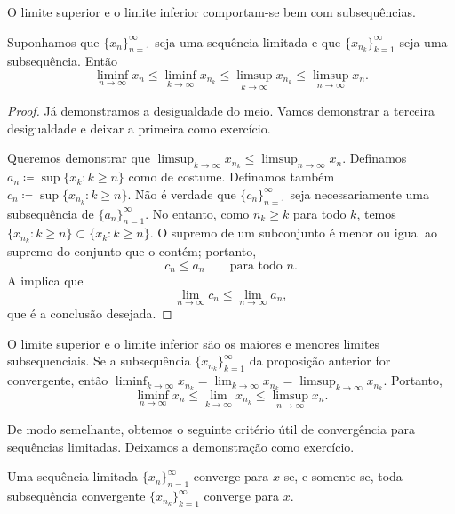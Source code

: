 O limite superior e o limite inferior comportam-se bem
com subsequências.

\begin{prop} \label{prop:subseqslimsupinf}
Suponhamos que $\{ x_n \}_{n=1}^\infty$ seja uma sequência limitada e
que $\{ x_{n_k} \}_{k=1}^\infty$ seja uma subsequência. Então
\begin{equation*}
\liminf_{n\to\infty} x_n \leq
\liminf_{k\to\infty} x_{n_k} \leq
\limsup_{k\to\infty} x_{n_k} \leq
\limsup_{n\to\infty} x_n .
\end{equation*}
\end{prop}

\begin{proof}
Já demonstramos a desigualdade do meio. Vamos demonstrar a terceira
desigualdade e deixar a primeira como exercício.

Queremos demonstrar que
$\limsup_{k\to\infty} x_{n_k} \leq \limsup_{n\to\infty} x_n$. Definamos
$a_n \coloneqq \sup \{ x_k : k \geq n \}$
como de costume.
Definamos também
$c_n \coloneqq \sup \{ x_{n_k} : k \geq n \}$.
Não é verdade que $\{ c_n \}_{n=1}^\infty$ seja necessariamente uma subsequência
de $\{ a_n \}_{n=1}^\infty$.
No entanto, como $n_k \geq k$ para todo $k$, temos
$\{ x_{n_k} : k \geq n \} \subset \{ x_k : k \geq n \}$.
O supremo de um subconjunto é menor ou igual ao supremo do
conjunto que o contém; portanto,
\begin{equation*}
c_n \leq a_n \qquad \text{para todo $n$}.
\end{equation*}
A  implica que
\begin{equation*}
\lim_{n\to\infty} c_n \leq \lim_{n\to\infty} a_n ,
\end{equation*}
que é a conclusão desejada.
\end{proof}

O limite superior e o limite inferior
são os maiores e menores
limites subsequenciais. Se a subsequência $\{ x_{n_k} \}_{k=1}^\infty$ da proposição anterior
for convergente, então
$\liminf_{k\to\infty} x_{n_k} = \lim_{k\to\infty} x_{n_k} =
\limsup_{k\to\infty} x_{n_k}$. Portanto,
\begin{equation*}
\liminf_{n\to\infty} x_n \leq
\lim_{k\to\infty} x_{n_k} \leq
\limsup_{n\to\infty} x_n .
\end{equation*}

De modo semelhante, obtemos o seguinte critério útil de convergência
para sequências limitadas. Deixamos a demonstração como exercício.

\begin{prop} \label{seqconvsubseqconv:prop}
Uma sequência limitada $\{ x_n \}_{n=1}^\infty$ converge para $x$
se, e somente se,
toda subsequência convergente
$\{ x_{n_k} \}_{k=1}^\infty$ converge para $x$.
\end{prop}

